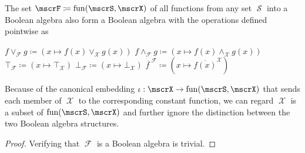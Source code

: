 \begin{proposition}\label{thm:functions_into_boolean_algebra_form_boolean_algebra}
  The set \( \mscrF \coloneqq \fun(\mscrS, \mscrX) \) of all functions from any set \( \mscrS \) into a Boolean algebra also form a Boolean algebra with the operations defined pointwise as
  \begin{refenum}
     \( f \vee_{\mscrF} g \coloneqq (x \mapsto f(x) \vee_{\mscrX} g(x)) \)
     \( f \wedge_{\mscrF} g \coloneqq (x \mapsto f(x) \wedge_{\mscrX} g(x)) \)
     \( \top_{\mscrF} \coloneqq (x \mapsto \top_{\mscrX}) \)
     \( \bot_{\mscrF} \coloneqq (x \mapsto \bot_{\mscrX}) \)
     \( \overline{f \ }^{\mscrF} \coloneqq (x \mapsto \overline{f(x)}^{\mscrX}) \)
  \end{refenum}

  Because of the canonical embedding \( \iota: \mscrX \to \fun(\mscrS, \mscrX) \) that sends each member of \( \mscrX \) to the corresponding constant function, we can regard \( \mscrX \) is a subset of \( \fun(\mscrS, \mscrX) \) and further ignore the distinction between the two Boolean algebra structures.
\end{proposition}
\begin{proof}
  Verifying that \( \mscrF \) is a Boolean algebra is trivial.
\end{proof}
